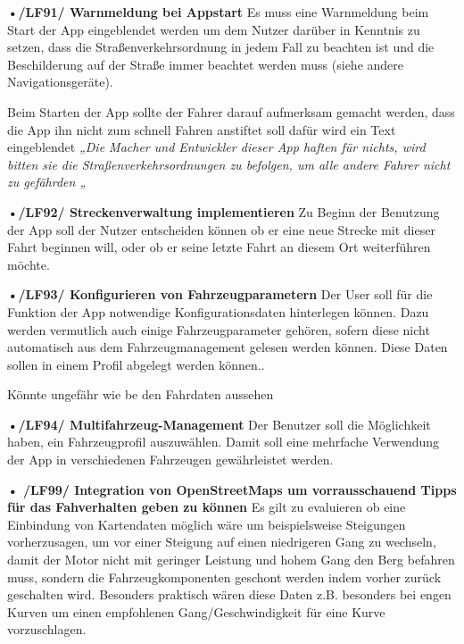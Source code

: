 \textbf{•/LF91/ Warnmeldung bei Appstart}
Es muss eine Warnmeldung beim Start der App eingeblendet werden um dem Nutzer darüber in Kenntnis zu setzen, dass die Straßenverkehrsordnung in jedem Fall zu beachten ist und die Beschilderung auf der Straße immer beachtet werden muss (siehe andere Navigationsgeräte).

Beim Starten der App sollte der Fahrer darauf aufmerksam gemacht werden, dass die App ihn nicht zum schnell Fahren anstiftet soll dafür wird ein Text eingeblendet
\emph{„Die Macher und Entwickler dieser App haften für nichts, wird bitten sie die Straßenverkehrsordnungen zu befolgen, um alle andere Fahrer nicht zu gefährden „}

\textbf{•/LF92/ Streckenverwaltung implementieren}
Zu Beginn der Benutzung der App soll der Nutzer entscheiden können ob er eine neue Strecke mit dieser Fahrt beginnen will, oder ob er seine letzte Fahrt an diesem Ort weiterführen möchte.

\textbf{•/LF93/ Konfigurieren von Fahrzeugparametern}
Der User soll für die Funktion der App notwendige Konfigurationsdaten hinterlegen können. Dazu werden vermutlich auch einige Fahrzeugparameter gehören, sofern diese nicht automatisch aus dem Fahrzeugmanagement gelesen werden können. Diese Daten sollen in einem Profil abgelegt werden können..

Könnte ungefähr wie be den Fahrdaten aussehen 

\textbf{•/LF94/ Multifahrzeug-Management}
Der Benutzer soll die Möglichkeit haben, ein Fahrzeugprofil auszuwählen. Damit soll eine mehrfache Verwendung der App in verschiedenen Fahrzeugen gewährleistet werden.

\textbf{• /LF99/ Integration von OpenStreetMaps um vorrausschauend Tipps für das Fahverhalten geben zu können}
Es gilt zu evaluieren ob eine Einbindung von Kartendaten möglich wäre um beispielsweise Steigungen vorherzusagen, um vor einer Steigung auf einen niedrigeren Gang zu wechseln, damit der Motor nicht mit geringer Leistung und hohem Gang den Berg befahren muss, sondern die Fahrzeugkomponenten geschont werden indem vorher zurück geschalten wird. Besonders praktisch wären diese Daten z.B. besonders bei engen Kurven um einen empfohlenen Gang/Geschwindigkeit für eine Kurve vorzuschlagen.


\begin{tabbing}

\end{tabbing}